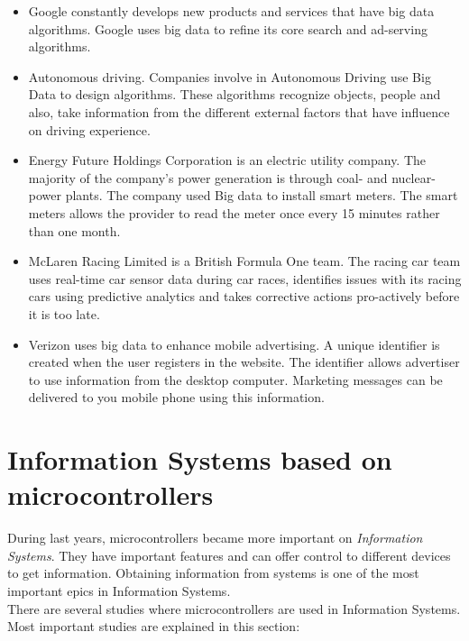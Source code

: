 \begin{itemize}

\item Google constantly develops new products and services that have big data algorithms. Google uses big data to refine its core search and ad-serving algorithms.

\item Autonomous driving. Companies involve in Autonomous Driving use Big Data to design algorithms. These algorithms recognize objects, people and also, take information from the different external factors that have influence on driving experience\cite{bmw_driving}.

\item Energy Future Holdings Corporation is an electric utility company. The majority of the company's power generation is through coal- and nuclear-power plants. The company used Big data to install smart meters. The smart meters allows the provider to read the meter once every 15 minutes rather than one month.

\item McLaren Racing Limited is a British Formula One team. The racing car team uses real-time car sensor data during car races, identifies issues with its racing cars using predictive analytics and takes corrective actions pro-actively before it is too late.

\item Verizon uses big data to enhance mobile advertising. A unique identifier is created when the user registers in the website. The identifier allows advertiser to use information from the desktop computer. Marketing messages can be delivered to you mobile phone using this information.

\end{itemize}

\section{Information Systems based on microcontrollers}

During last years, microcontrollers became more important on \textit{Information Systems}. They have important features and can offer control to different devices to get information. Obtaining information from systems is one of the most important epics in Information Systems.\\

There are several studies where microcontrollers are used in Information Systems. Most important studies are explained in this section:

